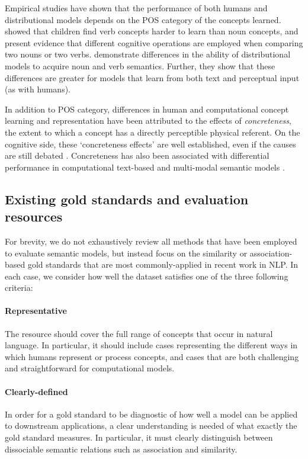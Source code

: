 Empirical studies have shown that the performance of both humans and distributional models depends on the POS category of the concepts learned. \cite{gentner2006verbs} showed that children find verb concepts harder to learn than noun concepts, and \cite{markman1997similar} present evidence that different cognitive operations are employed when comparing two nouns or two verbs. \cite{hill2014multi} demonstrate differences in the ability of distributional models to acquire noun and verb semantics. Further, they show that these differences are greater for models that learn from both text and perceptual input (as with humans).



In addition to POS category, differences in human and computational concept learning and representation have been attributed to the effects of \emph{concreteness}, the extent to which a concept has a directly perceptible physical referent. On the cognitive side, these `concreteness effects' are well established, even if the causes are still debated \cite{paivio1991dual,hill2013quantitative}. Concreteness has also been associated with differential performance in computational text-based \cite{hill2013concreteness} and multi-modal semantic models \cite{kielaimproving}.

\subsection{Existing gold standards and evaluation resources}

For brevity, we do not exhaustively review all methods that have been employed to evaluate semantic models, but instead focus on the similarity or association-based gold standards that are most commonly-applied in recent work in NLP. In each case, we consider how well the dataset satisfies one of the three following criteria:  

\paragraph{Representative} The resource should cover the full range of concepts that occur in natural language. In particular, it should include cases representing the different ways in which humans represent or process concepts, and cases that are both challenging and straightforward for computational models. 

\paragraph{Clearly-defined} In order for a gold standard to be diagnostic of how well a model can be applied to downstream applications, a clear understanding is needed of what exactly the gold standard measures. In particular, it must clearly distinguish between dissociable semantic relations such as association and similarity.

